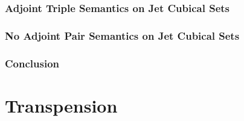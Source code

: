 \documentclass[a4paper]{memoir}
\begin{document}
\subsection{Adjoint Triple Semantics on Jet Cubical Sets} \label{sec:poresh-jcset:triple}

\subsection{No Adjoint Pair Semantics on Jet Cubical Sets} \label{sec:poresh-jcset:nogo}

\subsection{Conclusion}


%

\chapter{Transpension}

\appendix
\end{document}
